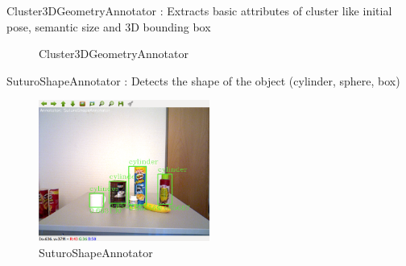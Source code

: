 \documentclass[main.tex]{subfiles}
\begin{document}
\begin{itemize}
    \begin{minipage}[t]{\textwidth}
    \item Cluster3DGeometryAnnotator : Extracts basic attributes of cluster like initial pose, semantic size and 3D bounding box 
        \begin{figure}[H]
                \centering
                 
                \caption{Cluster3DGeometryAnnotator}
          \end{figure}
    \end{minipage}

    \begin{minipage}[t]{\textwidth}
    \item SuturoShapeAnnotator : Detects the shape of the object (cylinder, sphere, box)
        \begin{figure}[H]
                \centering
                 \includegraphics[width=0.5\textwidth]{pictures/2d/SuturoShapeAnnotator.png}
                \caption{SuturoShapeAnnotator}
          \end{figure}
    \end{minipage}


\end{itemize}
\end{document}
